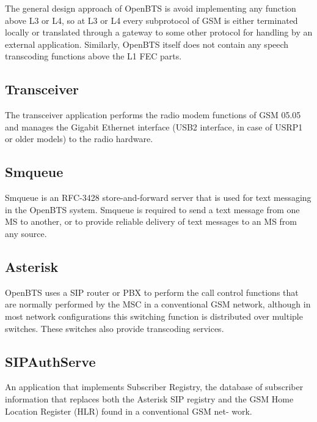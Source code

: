 The general design approach of OpenBTS is avoid implementing any function above L3 or L4,
so at L3 or L4 every subprotocol of GSM is either terminated locally or translated 
through a gateway to some other protocol for handling by an external application. 
Similarly, OpenBTS itself does not contain any speech transcoding functions above the
L1 FEC parts.

\subsection{Transceiver}
The transceiver application performs the radio modem functions of GSM 05.05 and manages 
the Gigabit Ethernet interface
(USB2 interface, in case
of USRP1 or older models) to the radio hardware.

\subsection{Smqueue}
Smqueue is an RFC-3428 store-and-forward server that is used for 
text messaging in the OpenBTS system. Smqueue is required to send 
a text message from one MS to another, or to provide reliable 
delivery of text messages to an MS from any source.

\subsection{Asterisk}
OpenBTS uses a SIP router or PBX to perform the 
call control functions that are normally performed by the MSC
in a conventional GSM network, although in 
most network configurations this switching
function is distributed over multiple switches. 
These switches also provide transcoding services.

\subsection{SIPAuthServe}
An application that implements Subscriber Registry, the database of subscriber 
information that replaces both
the Asterisk SIP registry and the GSM Home Location Register (HLR) 
found in a conventional GSM net-
work.



